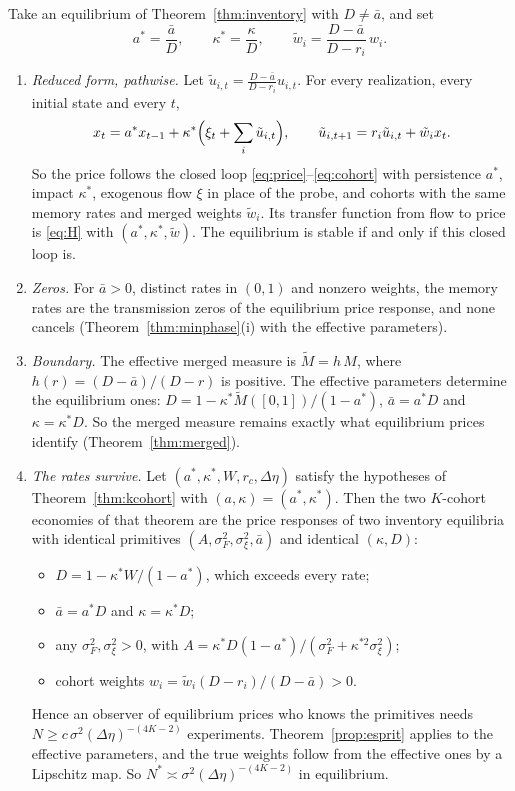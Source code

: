 \begin{theorem}\label{thm:eqreduced}
Take an equilibrium of Theorem~\ref{thm:inventory} with $D\ne\bar a$, and set
\[
 a^*=\frac{\bar a}{D},\qquad \kappa^*=\frac{\kappa}{D},\qquad \tilde w_i=\frac{D-\bar a}{D-r_i}\,w_i .
\]
\begin{enumerate}[label=(\roman*),itemsep=1pt]
\item \emph{Reduced form, pathwise.} Let $\tilde u_{i,t}=\frac{D-\bar a}{D-r_i}u_{i,t}$. For every realization, every initial state and every $t$,
\[
 x_t=a^*x_{t-1}+\kappa^*\Bigl(\xi_t+\sum_i\tilde u_{i,t}\Bigr),\qquad \tilde u_{i,t+1}=r_i\tilde u_{i,t}+\tilde w_ix_t .
\]
So the price follows the closed loop \eqref{eq:price}--\eqref{eq:cohort} with persistence $a^*$, impact $\kappa^*$, exogenous flow $\xi$ in place of the probe, and cohorts with the same memory rates and merged weights $\tilde w_i$. Its transfer function from flow to price is \eqref{eq:H} with $(a^*,\kappa^*,\tilde w)$. The equilibrium is stable if and only if this closed loop is.
\item \emph{Zeros.} For $\bar a>0$, distinct rates in $(0,1)$ and nonzero weights, the memory rates are the transmission zeros of the equilibrium price response, and none cancels (Theorem~\ref{thm:minphase}(i) with the effective parameters).
\item \emph{Boundary.} The effective merged measure is $\tilde M=h\,M$, where $h(r)=(D-\bar a)/(D-r)$ is positive. The effective parameters determine the equilibrium ones: $D=1-\kappa^*\tilde M([0,1])/(1-a^*)$, $\bar a=a^*D$ and $\kappa=\kappa^*D$. So the merged measure remains exactly what equilibrium prices identify (Theorem~\ref{thm:merged}).
\item \emph{The rates survive.} Let $(a^*,\kappa^*,W,r_c,\Delta\eta)$ satisfy the hypotheses of Theorem~\ref{thm:kcohort} with $(a,\kappa)=(a^*,\kappa^*)$. Then the two $K$-cohort economies of that theorem are the price responses of two inventory equilibria with identical primitives $(A,\sigma_F^2,\sigma_\xi^2,\bar a)$ and identical $(\kappa,D)$:
 \begin{itemize}[itemsep=1pt,topsep=2pt]
 \item $D=1-\kappa^*W/(1-a^*)$, which exceeds every rate;
 \item $\bar a=a^*D$ and $\kappa=\kappa^*D$;
 \item any $\sigma_F^2,\sigma_\xi^2>0$, with $A=\kappa^*D(1-a^*)/(\sigma_F^2+\kappa^{*2}\sigma_\xi^2)$;
 \item cohort weights $w_i=\tilde w_i(D-r_i)/(D-\bar a)>0$.
 \end{itemize}
 Hence an observer of equilibrium prices who knows the primitives needs $N\ge c\,\sigma^2(\Delta\eta)^{-(4K-2)}$ experiments. Theorem~\ref{prop:esprit} applies to the effective parameters, and the true weights follow from the effective ones by a Lipschitz map. So $N^*\asymp\sigma^2(\Delta\eta)^{-(4K-2)}$ in equilibrium.
\end{enumerate}
\end{theorem}

